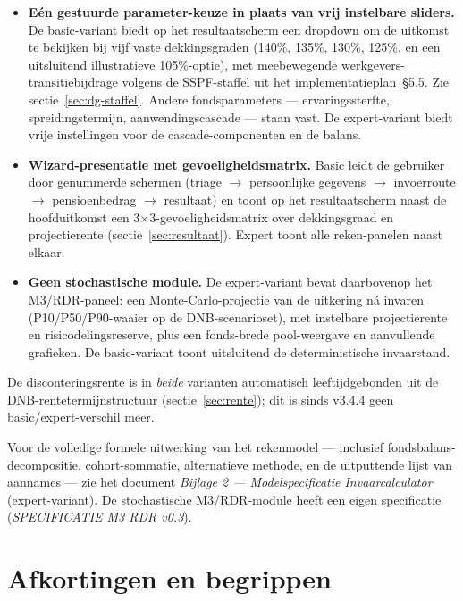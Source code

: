 \documentclass[11pt,a4paper]{article}
\begin{document}
\begin{itemize}
\item \textbf{Eén gestuurde parameter-keuze in plaats van vrij instelbare sliders.} De basic-variant biedt op het resultaatscherm een dropdown om de uitkomst te bekijken bij vijf vaste dekkingsgraden (140\%, 135\%, 130\%, 125\%, en een uitsluitend illustratieve 105\%-optie), met meebewegende werkgevers-transitiebijdrage volgens de SSPF-staffel uit het implementatieplan~\S5.5. Zie sectie~\ref{sec:dg-staffel}. Andere fondsparameters --- ervaringssterfte, spreidingstermijn, aanwendingscascade --- staan vast. De expert-variant biedt vrije instellingen voor de cascade-componenten en de balans.
\item \textbf{Wizard-presentatie met gevoeligheidsmatrix.} Basic leidt de gebruiker door genummerde schermen (triage $\to$ persoonlijke gegevens $\to$ invoerroute $\to$ pensioenbedrag $\to$ resultaat) en toont op het resultaatscherm naast de hoofduitkomst een 3$\times$3-gevoeligheidsmatrix over dekkingsgraad en projectierente (sectie~\ref{sec:resultaat}). Expert toont alle reken-panelen naast elkaar.
\item \textbf{Geen stochastische module.} De expert-variant bevat daarbovenop het M3/RDR-paneel: een Monte-Carlo-projectie van de uitkering ná invaren (P10/P50/P90-waaier op de DNB-scenarioset), met instelbare projectierente en risicodelingsreserve, plus een fonds-brede pool-weergave en aanvullende grafieken. De basic-variant toont uitsluitend de deterministische invaarstand.
\end{itemize}

De disconteringsrente is in \emph{beide} varianten automatisch leeftijdgebonden uit de DNB-rentetermijnstructuur (sectie~\ref{sec:rente}); dit is sinds v3.4.4 geen basic/expert-verschil meer.

Voor de volledige formele uitwerking van het rekenmodel --- inclusief fondsbalans-decompositie, cohort-sommatie, alternatieve methode, en de uitputtende lijst van aannames --- zie het document \emph{Bijlage 2 --- Modelspecificatie Invaarcalculator} (expert-variant). De stochastische M3/RDR-module heeft een eigen specificatie (\emph{SPECIFICATIE M3 RDR v0.3}).

\section{Afkortingen en begrippen}
\end{document}
